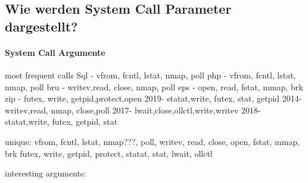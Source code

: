     \subsection{Wie werden System Call Parameter dargestellt?}
        \paragraph{System Call Argumente}  
            most frequent calls
            Sql - vfrom, fcntl, lstat, nmap, poll
            php - vfrom, fcntl, lstat, nmap, poll
            bru - writev,read,  close, nmap, poll
            eps - open,  read,  fstat, mmap, brk
            zip - futex, write, getpid,protect,open
            2019- statat,write, futex, stat, getpid
            2014- writev,read,  nmap,  close,poll
            2017- lwait,close,ollctl,write,writev
            2018- statat,write, futex, getpid, stat


            unique:
                vfrom, fcntl, lstat, nmap???, poll, writev, read, close, open, fstat, mmap, brk
                futex, write, getpid, protect, statat, stat, lwait, ollctl

        interesting arguments:
